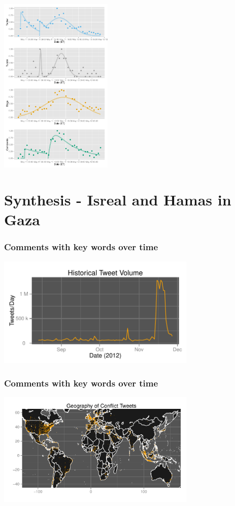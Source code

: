 \documentclass{beamer}
\begin{document}
\begin{frame}
  \begin{center}
    \includegraphics[height=8.5cm]{./imgs/SMP_JPMorgan.pdf}
  \end{center}
\end{frame}


\section{Synthesis - Isreal and Hamas in Gaza}

\begin{frame}\frametitle{Comments with key words over time}
  \begin{center}
    \includegraphics[width=9.5cm]{./imgs/HI_minimal-all-daily.pdf}
  \end{center}
\end{frame}

\begin{frame}\frametitle{Comments with key words over time}
  \begin{center}
    \includegraphics[width=9.5cm]{./imgs/HI_minimal-target-geo.pdf}
  \end{center}
\end{frame}
\end{document}
